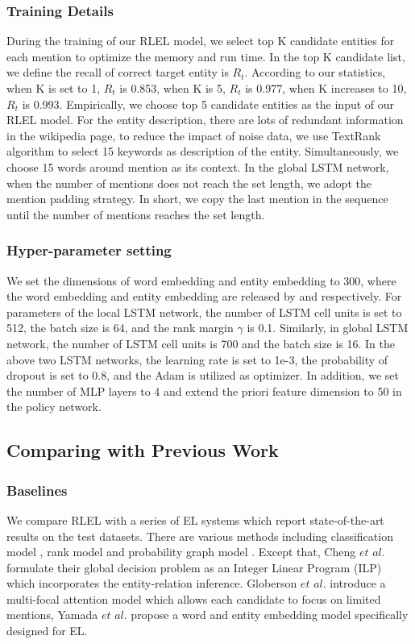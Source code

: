 \documentclass[sigconf]{acmart}
\begin{document}
\subsubsection*{Training Details}
During the training of our RLEL model, we select top K candidate entities for each mention to optimize the memory and run time. In the top K candidate list, we define the recall of correct target entity is $R_t$. According to our statistics, when K is set to 1, $R_t$ is 0.853, when K is 5, $R_t$ is 0.977, when K increases to 10, $R_t$ is 0.993. Empirically, we choose top 5 candidate entities as the input of our RLEL model. For the entity description, there are lots of redundant information in the wikipedia page, to reduce the impact of noise data, we use TextRank algorithm \cite{MihalceaT04} to select 15 keywords as description of the entity. Simultaneously, we choose 15 words around mention as its context. In the global LSTM network, when the number of mentions does not reach the set length, we adopt the mention padding strategy. In short, we copy the last mention in the sequence until the number of mentions reaches the set length.

\subsubsection*{Hyper-parameter setting}
We set the dimensions of word embedding and entity embedding to 300, where the word embedding and entity embedding are released by \cite{PenningtonSM14} and \cite{GaneaH17} respectively. For parameters of the local LSTM network, the number of LSTM cell units is set to 512, the batch size is 64, and the rank margin $\gamma$ is 0.1. Similarly, in global LSTM network, the number of LSTM cell units is 700 and the batch size is 16. In the above two LSTM networks, the learning rate is set to 1e-3,  the probability of dropout is set to 0.8, and the Adam is utilized as optimizer. In addition, we set the number of MLP layers to 4 and extend the priori feature dimension to 50 in the policy network.


\subsection{Comparing with Previous Work}
\subsubsection*{Baselines}
We compare RLEL with a series of EL systems which report state-of-the-art results on the test datasets. There are various methods including classification model \cite{MilneW08}, rank model \cite{ChisholmH15, RatinovRDA11} and probability graph model \cite{GuoB18, HoffartYBFPSTTW11, HuangHJ15, GaneaH17, TitovL18a}. Except that, Cheng $et$ $al.$\cite{ChengR13} formulate their global decision problem as an Integer Linear Program (ILP) which incorporates the entity-relation inference. Globerson $et$ $al.$ \cite{GlobersonLCSRP16} introduce a multi-focal attention model which allows each candidate to focus on limited mentions, Yamada $et$ $al.$\cite{YamadaS0T16} propose a word and entity embedding model specifically designed for EL. 
\end{document}
